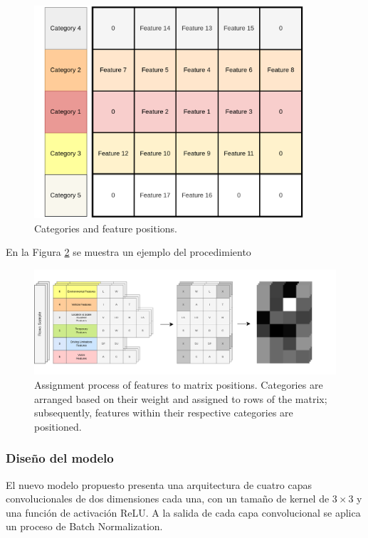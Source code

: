 \documentclass{uathesis-es}
\begin{document}
{	
	\begin{figure}[H]
		\centering
		\includegraphics[width=10cm]{Figures/indexing_positions_2.png}
		\caption{Categories and feature positions.}
		\label{MatrixIndexes}
	\end{figure}
	
	En la Figura \ref{MatrixConstruction} se muestra un ejemplo del procedimiento 
	
	\begin{figure}[H]
		\centering
		\includegraphics[width=17cm]{Figures/Matrix Construction_2.png}
		\caption{Assignment process of features to matrix positions. Categories are arranged based on their weight and assigned to rows of the matrix; subsequently, features within their respective categories are positioned.}
		\label{MatrixConstruction}
	\end{figure}
	
	\subsubsection{Diseño del modelo}
	
	El nuevo modelo propuesto presenta una arquitectura de cuatro capas convolucionales de dos dimensiones cada una, con un tamaño de kernel de $3 \times 3$ y una función de activación ReLU. A la salida de cada capa convolucional se aplica un proceso de Batch Normalization.
	
}
\end{document}
